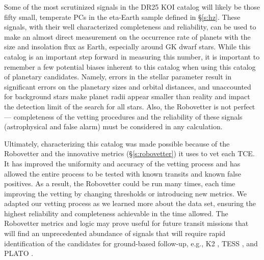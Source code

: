 Some of the most scrutinized signals in the DR25 KOI catalog will likely be those fifty small, temperate PCs in the eta-Earth sample defined in \S\ref{s:hz}.  These signals, with their well characterized completeness and reliability, can be used to make an almost direct measurement on the occurrence rate of planets with the size and insolation flux as Earth, especially around GK dwarf stars.  While this catalog is an important step forward in measuring this number, it is important to remember a few potential biases inherent to this catalog when using this catalog of planetary candidates. Namely, errors in the stellar parameter result in significant errors on the planetary sizes and orbital distances, and unaccounted for background stars make planet radii appear smaller than reality and impact the detection limit of the search for all stars.  Also, the Robovetter is not perfect --- completeness of the vetting procedures and the reliability of these signals (astrophysical and false alarm) must be considered in any calculation.


Ultimately, characterizing this catalog was made possible because of the Robovetter and the innovative metrics (\S\ref{s:robovetter}) it uses to vet each TCE. It has improved the uniformity and accuracy of the vetting process and has allowed the entire process to be tested with known transits and known false positives. As a result, the Robovetter could be run many times, each time improving the vetting by changing thresholds or introducing new metrics. We adapted our vetting process as we learned more about the data set, ensuring the highest reliability and completeness achievable in the time allowed.  The Robovetter metrics and logic may prove useful for future transit missions that will find an unprecedented abundance of signals that will require rapid identification of the candidates for ground-based follow-up, e.g., K2 \citep{Howell2014}, TESS \citep{Ricker2015}, and PLATO \citep{Rauer2016}. 


